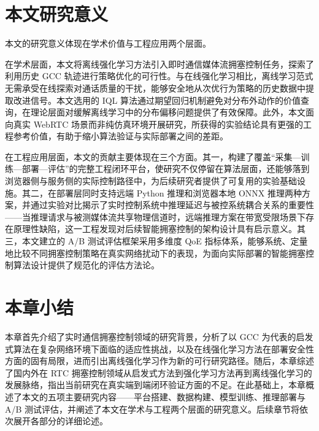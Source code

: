 \section{本文研究意义}
本文的研究意义体现在学术价值与工程应用两个层面。
\par 在学术层面，本文将离线强化学习方法引入即时通信媒体流拥塞控制任务，探索了利用历史 GCC 轨迹进行策略优化的可行性。与在线强化学习相比，离线学习范式无需承受在线探索对通话质量的干扰，能够安全地从次优行为策略的历史数据中提取改进信号。本文选用的 IQL 算法\cite{Kostrikov2021IQL}通过期望回归机制避免对分布外动作的价值查询，在理论层面对缓解离线学习中的分布偏移问题提供了有效保障。此外，本文面向真实 WebRTC 场景而非纯仿真环境开展研究，所获得的实验结论具有更强的工程参考价值，有助于缩小算法验证与实际部署之间的差距\cite{Pinyoanuntapong2021SimToReal}。
\par 在工程应用层面，本文的贡献主要体现在三个方面。其一，构建了覆盖“采集—训练—部署—评估”的完整工程闭环平台，使研究不仅停留在算法层面，还能够落到浏览器侧与服务侧的实际控制路径中，为后续研究者提供了可复用的实验基础设施。其二，在部署层同时支持远端 Python 推理和浏览器本地 ONNX 推理两种方案，并通过实验对比揭示了实时控制系统中推理延迟与被控系统耦合关系的重要性——当推理请求与被测媒体流共享物理信道时，远端推理方案在带宽受限场景下存在原理性缺陷，这一工程发现对后续智能拥塞控制的架构设计具有启示意义。其三，本文建立的 A/B 测试评估框架采用多维度 QoE 指标体系，能够系统、定量地比较不同拥塞控制策略在真实网络扰动下的表现，为面向实际部署的智能拥塞控制算法设计提供了规范化的评估方法论。

\section{本章小结}
本章首先介绍了实时通信拥塞控制领域的研究背景，分析了以 GCC 为代表的启发式算法在复杂网络环境下面临的适应性挑战，以及在线强化学习方法在部署安全性方面的固有局限，进而引出离线强化学习作为新的可行研究路径。随后，本章综述了国内外在 RTC 拥塞控制领域从启发式方法到强化学习方法再到离线强化学习的发展脉络，指出当前研究在真实端到端闭环验证方面的不足。在此基础上，本章概述了本文的五项主要研究内容——平台搭建、数据构建、模型训练、推理部署与 A/B 测试评估，并阐述了本文在学术与工程两个层面的研究意义。后续章节将依次展开各部分的详细论述。

